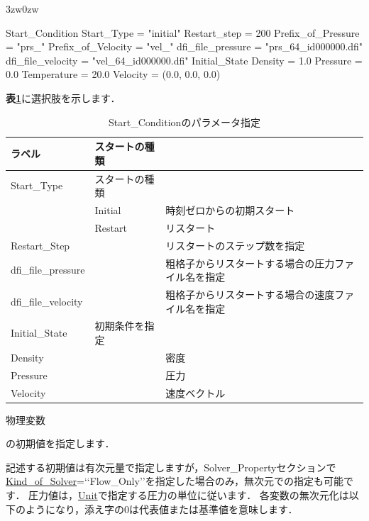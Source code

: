 \begin{indentation}{3zw}{0zw}

{\small
\begin{program}
  Start_Condition {
    Start_Type         = "initial"
    Restart_step       = 200
    Prefix_of_Pressure = "prs_"
    Prefix_of_Velocity = "vel_"
    dfi_file_pressure  = "prs_64_id000000.dfi"
    dfi_file_velocity  = "vel_64_id000000.dfi"
    Initial_State {
      Density     = 1.0
      Pressure    = 0.0
      Temperature = 20.0
      Velocity    = (0.0, 0.0, 0.0)
    }
  }
\end{program}
}

\textbf{表\ref{tbl:start}}に選択肢を示します．


\begin{table}[htdp]
\caption{Start\_Conditionのパラメータ指定}
\begin{center}
\small
\begin{tabular}{lll} \toprule
ラベル & スタートの種類 & \\ \midrule
Start\_Type & スタートの種類 & \\
 & Initial & 時刻ゼロからの初期スタート\\
 & Restart & リスタート\\ \hline
Restart\_Step & & リスタートのステップ数を指定\\ \hline
dfi\_file\_pressure & & 粗格子からリスタートする場合の圧力ファイル名を指定\\
dfi\_file\_velocity & & 粗格子からリスタートする場合の速度ファイル名を指定\\ \hline
Initial\_State & 初期条件を指定 & \\
Density & & 密度\\
Pressure & & 圧力\\
Velocity & & 速度ベクトル\\ \bottomrule
\end{tabular}
\end{center}
\label{tbl:start}
\end{table}

\hypertarget{tgt:initial_state}{物理変数}の初期値を指定します．

記述する初期値は有次元量で指定しますが，Solver\_Propertyセクションで\hyperlink{tgt:solver_property}{Kind\_of\_Solver}=\lq\lq Flow\_Only\rq\rq を指定した場合のみ，無次元での指定も可能です．
圧力値は，\hyperlink{tgt:unit}{Unit}で指定する圧力の単位に従います．
各変数の無次元化は以下のようになり，添え字の0は代表値または基準値を意味します．


\end{indentation}
